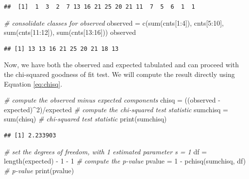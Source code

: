 \documentclass[
]{book}
\newenvironment{Shaded}{\begin{snugshade}}{\end{snugshade}}
\newcommand{\CommentTok}[1]{\textcolor[rgb]{0.56,0.35,0.01}{\textit{#1}}}
\newcommand{\DecValTok}[1]{\textcolor[rgb]{0.00,0.00,0.81}{#1}}
\newcommand{\FunctionTok}[1]{\textcolor[rgb]{0.00,0.00,0.00}{#1}}
\newcommand{\NormalTok}[1]{#1}
\newcommand{\OtherTok}[1]{\textcolor[rgb]{0.56,0.35,0.01}{#1}}
\newcommand{\SpecialCharTok}[1]{\textcolor[rgb]{0.00,0.00,0.00}{#1}}
\theoremstyle{definition}
\theoremstyle{definition}
\theoremstyle{definition}
\theoremstyle{definition}
\theoremstyle{remark}
\begin{document}
\begin{verbatim}
##  [1]  1  3  2  7 13 16 21 25 20 21 11  7  5  6  1  1
\end{verbatim}

\begin{Shaded}
\begin{Highlighting}[]
\CommentTok{\# consolidate classes for observed}
\NormalTok{observed }\OtherTok{=} \FunctionTok{c}\NormalTok{(}\FunctionTok{sum}\NormalTok{(cnts[}\DecValTok{1}\SpecialCharTok{:}\DecValTok{4}\NormalTok{]), cnts[}\DecValTok{5}\SpecialCharTok{:}\DecValTok{10}\NormalTok{], }\FunctionTok{sum}\NormalTok{(cnts[}\DecValTok{11}\SpecialCharTok{:}\DecValTok{12}\NormalTok{]), }\FunctionTok{sum}\NormalTok{(cnts[}\DecValTok{13}\SpecialCharTok{:}\DecValTok{16}\NormalTok{]))}
\NormalTok{observed}
\end{Highlighting}
\end{Shaded}

\begin{verbatim}
## [1] 13 13 16 21 25 20 21 18 13
\end{verbatim}

Now, we have both the observed and expected tabulated and can proceed with the chi-squared goodness of fit test. We will compute the result directly using Equation \eqref{eq:chisq}.

\begin{Shaded}
\begin{Highlighting}[]
\CommentTok{\# compute the observed minus expected components}
\NormalTok{chisq }\OtherTok{=}\NormalTok{ ((observed }\SpecialCharTok{{-}}\NormalTok{ expected)}\SpecialCharTok{\^{}}\DecValTok{2}\NormalTok{)}\SpecialCharTok{/}\NormalTok{expected}
\CommentTok{\# compute the chi{-}squared test statistic}
\NormalTok{sumchisq }\OtherTok{=} \FunctionTok{sum}\NormalTok{(chisq)}
\CommentTok{\# chi{-}squared test statistic}
\FunctionTok{print}\NormalTok{(sumchisq)}
\end{Highlighting}
\end{Shaded}

\begin{verbatim}
## [1] 2.233903
\end{verbatim}

\begin{Shaded}
\begin{Highlighting}[]
\CommentTok{\# set the degrees of freedom, with 1 estimated parameter s = 1}
\NormalTok{df }\OtherTok{=} \FunctionTok{length}\NormalTok{(expected) }\SpecialCharTok{{-}} \DecValTok{1} \SpecialCharTok{{-}} \DecValTok{1}
\CommentTok{\# compute the p{-}value}
\NormalTok{pvalue }\OtherTok{=} \DecValTok{1} \SpecialCharTok{{-}} \FunctionTok{pchisq}\NormalTok{(sumchisq, df)}
\CommentTok{\# p{-}value}
\FunctionTok{print}\NormalTok{(pvalue)}
\end{Highlighting}
\end{Shaded}
\end{document}
